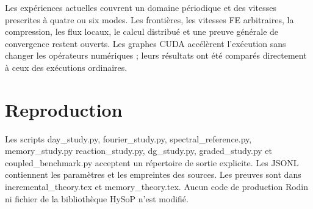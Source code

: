 \documentclass[10pt,a4paper]{article}
\begin{document}
Les expériences actuelles couvrent un domaine périodique et des vitesses prescrites à quatre ou six modes. Les frontières, les vitesses FE arbitraires, la compression, les flux locaux, le calcul distribué et une preuve générale de convergence restent ouverts. Les graphes CUDA accélèrent l'exécution sans changer les opérateurs numériques ; leurs résultats ont été comparés directement à ceux des exécutions ordinaires.

\section{Reproduction}
Les scripts day\_study.py, fourier\_study.py, spectral\_reference.py, memory\_study.py reaction\_study.py, dg\_study.py, graded\_study.py et coupled\_benchmark.py acceptent un répertoire de sortie explicite. Les JSONL contiennent les paramètres et les empreintes des sources. Les preuves sont dans incremental\_theory.tex et memory\_theory.tex. Aucun code de production Rodin ni fichier de la bibliothèque HySoP n'est modifié.
\end{document}
